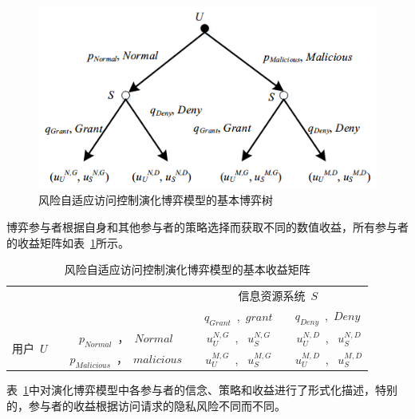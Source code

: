 \begin{figure}[htbp]
	\centering
	\includegraphics[width = 0.6\linewidth]{./figures/game-tree.png}
	\caption{风险自适应访问控制演化博弈模型的基本博弈树}
	\label{fig:game-tree}
\end{figure}

博弈参与者根据自身和其他参与者的策略选择而获取不同的数值收益，所有参与者的收益矩阵如表~\ref{tab:privacy-utilities-matrix}所示。

\begin{table}[htbp]
	\caption{风险自适应访问控制演化博弈模型的基本收益矩阵}
	\label{tab:privacy-utilities-matrix}
	\centering
	\begin{tabular}{cccc}%
		
		\toprule
		\textbf{ }&\textbf{ }&\multicolumn{2}{c}{信息资源系统~$S$~}\\
		\textbf{ }&\textbf{ }& ~$q_{Grant}$~,~$grant$~&~$q_{Deny}$~,~$Deny~$\\
		\midrule
		\multirow{2}{*}{用户~$U$~} & ~$p_{Normal}$~，~$Normal$~ &~$u_U^{N,G}$~, ~$u_S^{N,G}$~ & ~$u_U^{N,D}$~, ~$u_S^{N,D}$\\
		& ~$p_{Malicious}$~，~$malicious$~ &~$u_U^{M,G}$~, ~$u_S^{M,G}$~ & ~$u_U^{M,D}$~, ~$u_S^{M,D}$\\
		\bottomrule
	\end{tabular}
\end{table}

表~\ref{tab:privacy-utilities-matrix}中对演化博弈模型中各参与者的信念、策略和收益进行了形式化描述，特别的，参与者的收益根据访问请求的隐私风险不同而不同。


